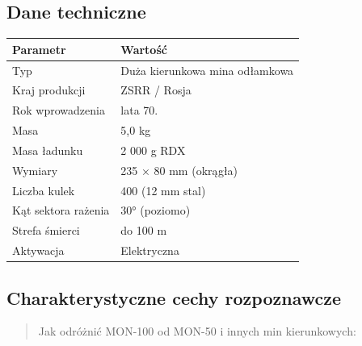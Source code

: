 \documentclass[12pt,oneside]{book}
\begin{document}
\subsection{Dane techniczne}\label{dane-techniczne-128}

\begin{longtable}[]{@{}ll@{}}
\toprule\noalign{}
Parametr & Wartość \\
\midrule\noalign{}
\endhead
\bottomrule\noalign{}
\endlastfoot
Typ & Duża kierunkowa mina odłamkowa \\
Kraj produkcji & ZSRR / Rosja \\
Rok wprowadzenia & lata 70. \\
Masa & 5,0 kg \\
Masa ładunku & 2 000 g RDX \\
Wymiary & 235 × 80 mm (okrągła) \\
Liczba kulek & 400 (12 mm stal) \\
Kąt sektora rażenia & 30° (poziomo) \\
Strefa śmierci & do 100 m \\
Aktywacja & Elektryczna \\
\end{longtable}

\subsection{Charakterystyczne cechy
rozpoznawcze}\label{charakterystyczne-cechy-rozpoznawcze-128}

\begin{quote}
Jak odróżnić MON-100 od MON-50 i innych min kierunkowych:
\end{quote}
\end{document}
